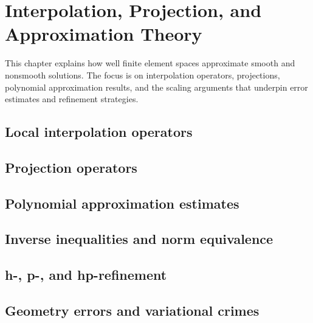 \chapter{Interpolation, Projection, and Approximation Theory}
\label{ch:approximation}

This chapter explains how well finite element spaces approximate smooth and
nonsmooth solutions. The focus is on interpolation operators, projections,
polynomial approximation results, and the scaling arguments that underpin error
estimates and refinement strategies.

\section{Local interpolation operators}
\label{sec:approximation:interpolation}


\section{Projection operators}
\label{sec:approximation:projection}


\section{Polynomial approximation estimates}
\label{sec:approximation:polynomial}


\section{Inverse inequalities and norm equivalence}
\label{sec:approximation:inverse}


\section{h-, p-, and hp-refinement}
\label{sec:approximation:refinement}


\section{Geometry errors and variational crimes}
\label{sec:approximation:variational_crimes}


